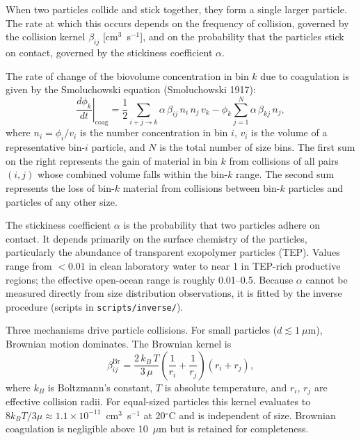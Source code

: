 \documentclass[12pt,a4paper]{report}
\numberwithin{equation}{chapter}
\begin{document}
When two particles collide and stick together, they form a single larger
particle. The rate at which this occurs depends on the frequency of collision,
governed by the collision kernel $\beta_{ij}$ [cm$^3$~s$^{-1}$], and on
the probability that the particles stick on contact, governed by the
stickiness coefficient $\alpha$.

The rate of change of the biovolume concentration in bin $k$ due to
coagulation is given by the Smoluchowski equation (Smoluchowski 1917):
\begin{equation}
    \left.\frac{d\phi_k}{dt}\right|_\mathrm{coag}
    = \frac{1}{2}\sum_{i+j \to k} \alpha\,\beta_{ij}\,n_i\,n_j\,v_k
    - \phi_k \sum_{j=1}^{N} \alpha\,\beta_{kj}\,n_j,
    \label{eq:coag}
\end{equation}
where $n_i = \phi_i / v_i$ is the number concentration in bin $i$,
$v_i$ is the volume of a representative bin-$i$ particle, and $N$ is
the total number of size bins. The first sum on the right represents the
gain of material in bin $k$ from collisions of all pairs $(i,j)$ whose
combined volume falls within the bin-$k$ range. The second sum represents
the loss of bin-$k$ material from collisions between bin-$k$ particles
and particles of any other size.

The stickiness coefficient $\alpha$ is the probability that two particles
adhere on contact. It depends primarily on the surface chemistry of the
particles, particularly the abundance of transparent exopolymer particles (TEP).
Values range from $<0.01$ in clean laboratory water to near 1 in TEP-rich
productive regions; the effective open-ocean range is roughly 0.01--0.5.
Because $\alpha$ cannot be measured directly from size distribution
observations, it is fitted by the inverse procedure
(scripts in \texttt{scripts/inverse/}).

Three mechanisms drive particle collisions. For small particles
($d \lesssim 1~\mu$m), Brownian motion dominates. The Brownian kernel is
\begin{equation}
    \beta_{ij}^\mathrm{Br}
    = \frac{2\,k_B\,T}{3\,\mu}
      \left(\frac{1}{r_i} + \frac{1}{r_j}\right)(r_i + r_j),
    \label{eq:kern_br}
\end{equation}
where $k_B$ is Boltzmann's constant, $T$ is absolute temperature, and
$r_i$, $r_j$ are effective collision radii. For equal-sized particles this
kernel evaluates to $8k_BT/3\mu \approx 1.1 \times 10^{-11}$~cm$^3$~s$^{-1}$
at 20$^\circ$C and is independent of size. Brownian coagulation is negligible
above 10~$\mu$m but is retained for completeness.
\end{document}
